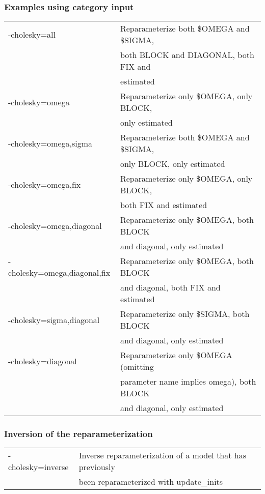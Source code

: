 \subsubsection*{Examples using category input}
\begin{tabular}{ll}
	-cholesky=all &                Reparameterize both \$OMEGA and \$SIGMA,\\
     & both BLOCK and DIAGONAL, both FIX and\\
     &  estimated\\
	-cholesky=omega &              Reparameterize only \$OMEGA, only BLOCK,\\
     & only estimated\\
	-cholesky=omega,sigma &              Reparameterize both \$OMEGA and \$SIGMA,\\
     &  only BLOCK, only estimated\\
	-cholesky=omega,fix &          Reparameterize only \$OMEGA, only BLOCK,\\
      &  both FIX and estimated\\
	-cholesky=omega,diagonal &     Reparameterize only \$OMEGA, both BLOCK\\
       &  and diagonal, only estimated\\
	-cholesky=omega,diagonal,fix & Reparameterize only \$OMEGA, both BLOCK\\
  &  and diagonal, both FIX and estimated\\
	-cholesky=sigma,diagonal &     Reparameterize only \$SIGMA, both BLOCK\\
      &  and diagonal, only estimated\\
	-cholesky=diagonal  &          Reparameterize only \$OMEGA (omitting\\
      &  parameter name implies omega), both BLOCK\\
       &  and diagonal, only estimated \\
\end{tabular}

\subsubsection*{Inversion of the reparameterization}
\begin{tabular}{ll}
    -cholesky=inverse &             Inverse reparameterization of a model that has previously\\
     &  been reparameterized with update\_inits\\
\end{tabular}


